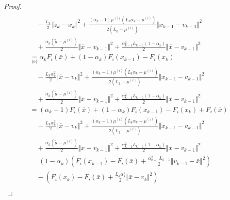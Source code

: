 \documentclass[12pt]{article}
\begin{document}
\begin{proof}
{\begin{align*}
                    \\&\quad 
                    - \frac{L_k}{2}\Vert z_k - x_k\Vert^2 
                    + \frac{(\alpha_k - 1)\mu^{(i)}\left(L_k\alpha_k - \mu^{(i)}\right)}{2\left(L_k - \mu^{(i)}\right)}
                    \Vert x_{k - 1} - v_{k - 1} \Vert^2
                    \\ &\quad 
                    + \frac{\alpha_k(\tilde\mu - \mu^{(i)})}{2} \Vert \bar x - v_{k - 1}\Vert^2
                    + \frac{\alpha_{k - 1}^2L_{k - 1}(1 - \alpha_k)}{2} \Vert \bar x - v_{k - 1}\Vert^2
                \\
                &\underset{\text{(e)}}{=} 
                \alpha_k F_i(\bar x) + (1 - \alpha_k)F_i(x_{k - 1}) - F_i(x_k) 
                    \\&\quad 
                    - \frac{L_k\alpha_k^2}{2}\Vert \bar x - v_k\Vert^2 
                    + \frac{(\alpha_k - 1)\mu^{(i)}\left(L_k\alpha_k - \mu^{(i)}\right)}{2\left(L_k - \mu^{(i)}\right)}
                    \Vert x_{k - 1} - v_{k - 1} \Vert^2
                    \\ &\quad 
                    + \frac{\alpha_k(\tilde\mu - \mu^{(i)})}{2} \Vert \bar x - v_{k - 1}\Vert^2
                    + \frac{\alpha_{k - 1}^2L_{k - 1}(1 - \alpha_k)}{2} \Vert \bar x - v_{k - 1}\Vert^2
                \\
                &= (\alpha_k - 1)F_i(\bar x) + (1 - \alpha_k)F_i(x_{k - 1}) - F_i(x_k) + F_i(\bar x)
                    \\&\quad 
                    - \frac{L_k\alpha_k^2}{2}\Vert \bar x - v_k\Vert^2 
                    + \frac{(\alpha_k - 1)\mu^{(i)}\left(L_k\alpha_k - \mu^{(i)}\right)}{2\left(L_k - \mu^{(i)}\right)}\Vert x_{k - 1} - v_{k - 1} \Vert^2
                    \\ &\quad 
                    + \frac{\alpha_k(\tilde\mu - \mu^{(i)})}{2} \Vert \bar x - v_{k - 1}\Vert^2
                    + \frac{\alpha_{k - 1}^2L_{k - 1}(1 - \alpha_k)}{2} \Vert \bar x - v_{k - 1}\Vert^2
                \\
                &= (1 - \alpha_k)\left(
                    F_i(x_{k - 1}) - F_i(\bar x) + \frac{\alpha_{k - 1}^2L_{k - 1}}{2}\Vert v_{k - 1} - \bar x\Vert^2
                \right) 
                    \\ & \quad
                    - \left(
                        F_i(x_{k}) - F_i(\bar x) + \frac{L_k\alpha_k^2}{2}\Vert \bar x - v_k\Vert^2 
                    \right)
                    \\ &\quad 

\end{align*}}
\end{proof}
\end{document}
